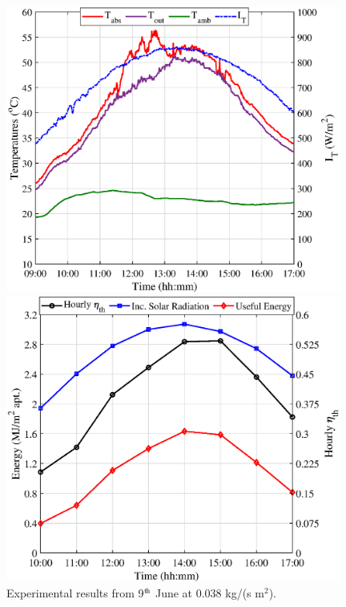 \begin{figure}[!ht]
	\centering
	\begin{minipage}{0.49\textwidth}
		\centering
		\includegraphics[width=0.98\textwidth]{figs/004-1.eps} %
	\end{minipage}\hfill
	\begin{minipage}{0.49\textwidth}
		\centering
		\includegraphics[width=0.98\textwidth]{figs/004-2.eps} %
	\end{minipage}

	\caption{Experimental results from 9$^{\rm{th}}$ June at 0.038 kg/(s m$^2$).}
	\label{004}
\end{figure}

